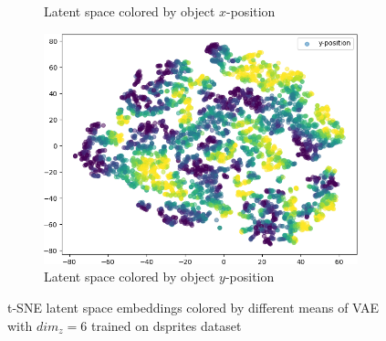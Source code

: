 \begin{figure}
\begin{adjustbox}{valign=T}
\begin{subfigure}{.19\textwidth}
            \caption{Latent space colored by object $x$-position}
        \end{subfigure}
    \end{adjustbox}
    \hfill
    \begin{adjustbox}{valign=T}
        \begin{subfigure}{.19\textwidth}
            \includegraphics[width=\textwidth]{images/latent_spaces/dsprites/vae/embeddings_mu_4.png}
            \caption{Latent space colored by object $y$-position}
        \end{subfigure}
    \end{adjustbox}
    \caption[\ac{VAE} Latent Space on dsprites]{\ac{t-SNE} latent space embeddings colored by different means of \ac{VAE} with $dim_z=6$ trained on dsprites dataset}
    \label{fig:vae_latent_space_dsprites}
\end{figure}

